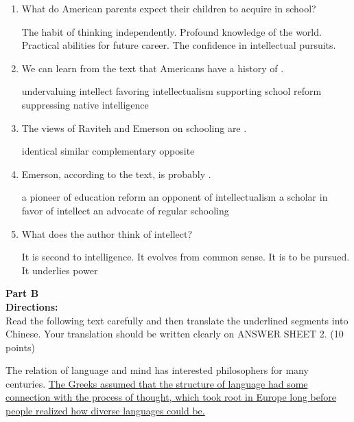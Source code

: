 \begin{enumerate}[resume]
	\item
 What do American parents expect their children to acquire in school?


\fourchoices
{The habit of thinking independently.}
{Profound knowledge of the world.}
{Practical abilities for future career.}
{The confidence in intellectual pursuits.}


\item
We can learn from the text that Americans have a history
of \lineread.


\fourchoices
{undervaluing intellect}
{favoring intellectualism}
{supporting school reform}
{suppressing native intelligence}


\item
The views of Raviteh and Emerson on schooling are \lineread.


\fourchoices
{identical}
{similar}
{complementary}
{opposite}


\item
Emerson, according to the text, is probably \lineread.


\fourchoices
{a pioneer of education reform}
{an opponent of intellectualism}
{a scholar in favor of intellect}
{an advocate of regular schooling}



\item
What does the author think of intellect?


\fourchoices
{It is second to intelligence.}
{It evolves from common sense.}
{It is to be pursued.}
{It underlies power}


\end{enumerate}


\newpage

\noindent
\textbf{Part B}\\
\textbf{Directions:}\\
Read the following text carefully and then translate the
	underlined segments into Chinese. Your translation should be written
	clearly on ANSWER SHEET 2. (10 points)


\TiGanSpace


The relation of language and mind has interested philosophers for many
centuries. \transnum \uline{The Greeks assumed that the structure of
	language had some connection with the process of thought, which took
	root in Europe long before people realized how diverse languages could
	be.}


